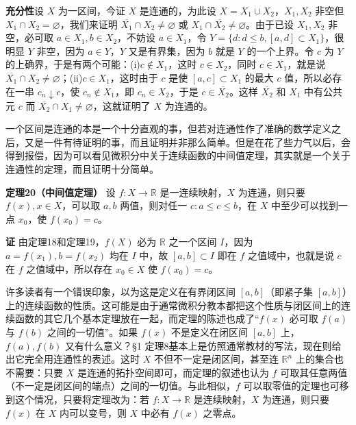 \textbf{充分性}\quad 设 $X$ 为一区间，今证 $X$ 是连通的，为此设 $X=X_1\cup X_2$，$X_1,X_2$ 非空但 $X_1\cap X_2=\varnothing$，我们来证明 $\overline{X_1}\cap X_2\ne\varnothing$ 或 $X_1\cap\overline{X_2}\ne\varnothing$。由于已设 $X_1,X_2$ 非空，必可取 $a\in X_1,b\in X_2$，不妨设 $a\in X_1$，令 $Y=\{d:d\le b,[a,d]\subset X_1\}$，很明显 $Y$ 非空，因为 $a\in Y$，$Y$ 又是有界集，因为 $b$ 就是 $Y$ 的一个上界。令 $c$ 为 $Y$ 的上确界，于是有两个可能：(i)$c\notin X_1$，这时 $c\in X_2$，同时 $c\in\overline{X_1}$，就是说 $\overline{X_1}\cap X_2\ne\varnothing$；(ii)$c\in X_1$，这时由于 $c$ 是使 $[a,c]\subset X_1$ 的最大 $c$ 值，所以必存在一串 $c_n\downarrow c$，使 $c_n\notin X_1$，即 $c_n\in X_2$，于是 $c\in\overline{X_2}$。这样 $\overline{X_2}$ 和 $X_1$ 中有公共元 $c$ 而 $\overline{X_2}\cap X_1\ne\varnothing$，这就证明了 $X$ 为连通的。

一个区间是连通的本是一个十分直观的事，但若对连通性作了准确的数学定义之后，又是一件有待证明的事，而且证明并非那么简单。但是在花了些力气以后，会得到报偿，因为可以看见微积分中关于连续函数的中间值定理，其实就是一个关于连通性的定理，而且证明十分简单。

\noindent\textbf{定理20（中间值定理）}\quad
设 $f:X\to\mathbb R$ 是一连续映射，$X$ 为连通，则只要 $f(x),x\in X$，可以取 $a,b$ 两值，则对任一 $c:a\le c\le b$，在 $X$ 中至少可以找到一点 $x_0$，使 $f(x_0)=c$。

\noindent\textbf{证}\quad
由定理18和定理19，$f(X)$ 必为 $\mathbb R$ 之一个区间 $I$，因为 $a=f(x_1),b=f(x_2)$ 均在 $I$ 中，故 $[a,b]\subset I$ 即在 $f$ 之值域中，也就是说 $c$ 在 $f$ 之值域中，所以存在 $x_0\in X$ 使 $f(x_0)=c$。

许多读者有一个错误印象，以为这是定义在有界闭区间 $[a,b]$（即紧子集 $[a,b]$）上的连续函数的性质。这可能是由于通常微积分教本都把这个性质与闭区间上的连续函数的其它几个基本定理放在一起，而定理的陈述也成了“$f(x)$ 必可取 $f(a)$ 与 $f(b)$ 之间的一切值”。如果 $f(x)$ 不是定义在闭区间 $[a,b]$ 上，$f(a),f(b)$ 又有什么意义？\S1 定理8基本上是仿照通常教材的写法，现在则给出它完全用连通性的表述。这时 $X$ 不但不一定是闭区间，甚至连 $\mathbb R^n$ 上的集合也不需要：只要 $X$ 是连通的拓扑空间即可，而定理的叙述也认为 $f$ 可取其任意两值（不一定是闭区间的端点）之间的一切值。与此相似，$f$ 可以取零值的定理也可移到这个情况，只要将定理改为：若 $f:X\to\mathbb R$ 是连续映射，$X$ 为连通，则只要 $f(x)$ 在 $X$ 内可以变号，则 $X$ 中必有 $f(x)$ 之零点。

